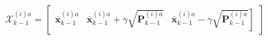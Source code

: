 $$
\mathcal{X}_{k-1}^{(i) a}=\left[\begin{array}{lll}
\overline{\boldsymbol{x}}_{k-1}^{(i) a} & \overline{\boldsymbol{x}}_{k-1}^{(i) a}+\gamma \sqrt{\mathbf{P}_{k-1}^{(i) a}} & \left.\overline{\boldsymbol{x}}_{k-1}^{(i) a}-\gamma \sqrt{\mathbf{P}_{k-1}^{(i) a}}\right]
\end{array}\right]
$$